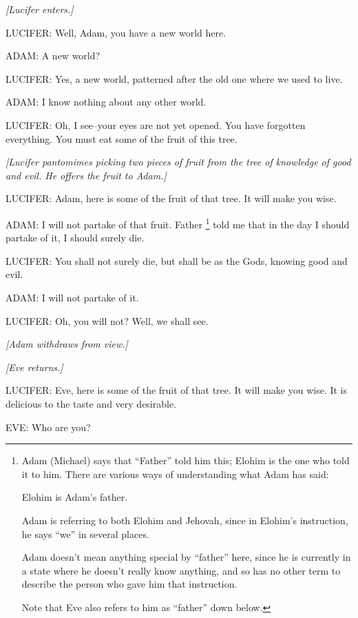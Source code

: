			\textit{[Lucifer enters.]}

			LUCIFER: Well, Adam, you have a new world here.

			ADAM: A new world?

			LUCIFER: Yes, a new world, patterned after the old one where we used to live.

			ADAM: I know nothing about any other world.

			LUCIFER: Oh, I see--your eyes are not yet opened. You have forgotten everything. You must eat some of the fruit of this tree.

			\textit{[Lucifer pantomimes picking two pieces of fruit from the tree of knowledge of good and evil. He offers the fruit to Adam.]}

			LUCIFER: Adam, here is some of the fruit of that tree. It will make you wise.

			ADAM: I will not partake of that fruit. Father%
				\footnote{%
					\label{ENDOWMENT-father}%
					Adam (Michael) says that ``Father'' told him this; Elohim is the one who told it to him. There are various ways of understanding what Adam has said:
						\begin{compactenum}
							\item Elohim is Adam's father.
							\item Adam is referring to both Elohim and Jehovah, since in Elohim's instruction, he says ``we'' in several places.
							\item Adam doesn't mean anything special by ``father'' here, since he is currently in a state where he doesn't really know anything, and so has no other term to describe the person who gave him that instruction.
						\end{compactenum}
					Note that Eve also refers to him as ``father'' down below.
					}
			told me that in the day I should partake of it, I should surely die.

			LUCIFER: You shall not surely die, but shall be as the Gods, knowing good and evil.

			ADAM: I will not partake of it.

			LUCIFER: Oh, you will not? Well, we shall see.

			\textit{[Adam withdraws from view.]}
			
			\textit{[Eve returns.]}

			LUCIFER: Eve, here is some of the fruit of that tree. It will make you wise. It is delicious to the taste and very desirable.

			EVE: Who are you?

